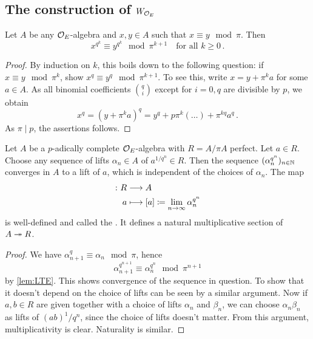 \documentclass[a4paper, 10pt, oneside, DIV=9, chapterprefix=true, numbers=enddot,bibliography=totoc]{scrbook}
\begin{document}
\subsection{The construction of \texorpdfstring{$W_{\mathcal{O}_E}$}{W}}
\begin{lem}\label{lem:LTE}
	Let $A$ be any $\mathcal{O}_E$-algebra and $x,y\in A$ such that $x\equiv y\mod \pi$. Then
	\begin{equation*}
		x^{q^k}\equiv y^{q^k}\mod \pi^{k+1}\quad\text{for all }k\geq 0\,.
	\end{equation*}
\end{lem}
\begin{proof}
	By induction on $k$, this boils down to the following question: if $x\equiv y\mod \pi^k$, show $x^q\equiv y^q\mod \pi^{k+1}$. To see this, write $x=y+\pi^ka$ for some $a\in A$. As all binomial coefficients $\binom{q}{i}$ except for $i=0,q$ are divisible by $p$, we obtain 
	\begin{equation*}
		x^q=(y+\pi^ka)^q=y^q+p\pi^k(\ldots)+\pi^{kq}a^q\,.
	\end{equation*}
	As $\pi\mid p$, the assertions follows.
\end{proof}
\begin{deflem}\label{deflem:Teichmüller}
	Let $A$ be a $p$-adically complete $\mathcal{O}_E$-algebra with $R=A/\pi A$ perfect. Let $a\in R$. Choose any sequence of lifts $\alpha_n\in A$ of $a^{1/q^n}\in R$. Then the sequence $(\alpha_n^{q^n})_{n\in \mathbb{N}}$ converges in $A$ to a lift of $a$, which is independent of the choices of $\alpha_n$. The map
	\begin{align*}
		[-]\colon R&\morphism A\\
		a&\longmapsto [a]\coloneqq\lim_{n\to\infty}\alpha_n^{q^n}
	\end{align*}
	is well-defined and called the . It defines a natural multiplicative section of $A\epimorphism R$.
\end{deflem}
\begin{proof}
	We have $\alpha_{n+1}^q\equiv \alpha_n\mod \pi$, hence
	\begin{equation*}
		\alpha_{n+1}^{q^{n+1}}\equiv \alpha_n^{q^n}\mod \pi^{n+1}
	\end{equation*}
	by \cref{lem:LTE}. This shows convergence of the sequence in question. To show that it doesn't depend on the choice of lifts can be seen by a similar argument. Now if $a,b\in R$ are given together with a choice of lifts $\alpha_n$ and $\beta_n$, we can choose $\alpha_n\beta_n$ as lifts of $(ab)^1/q^n$, since the choice of lifts doesn't matter. From this argument, multiplicativity is clear. Naturality is similar.
\end{proof}
\end{document}
